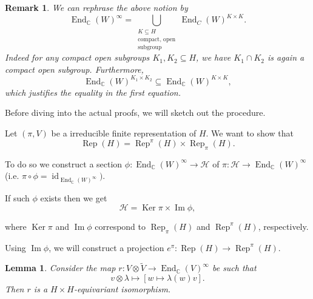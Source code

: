 \documentclass[8pt]{article}
\newtheorem{lemma}{Lemma}[section]
\newtheorem{remark}{Remark}[section]
\DeclareMathOperator{\Rep}{Rep}
\DeclareMathOperator{\End}{End}
\DeclareMathOperator{\Image}{Im}
\DeclareMathOperator{\Ker}{Ker}
\DeclareMathOperator{\id}{id}
\newcommand{\C}[0]{\mathbb{C}}
\newcommand{\hecke}[0]{\mathscr{H}}
\begin{document}
\begin{remark}
  We can rephrase the above notion by
  \begin{equation*}
    \End_\C(W)^\infty = \bigcup_{\substack{K\subseteq H \\ \text{compact, open}\\\text{subgroup}}} \End_C(W)^{K\times K}.
  \end{equation*}
  Indeed for any compact open subgroups $K_1,K_2\subseteq H$, we have $K_1\cap K_2$ is again a compact open subgroup. Furthermore,
  \begin{equation*}
    \End_\C(W)^{K_1\times K_2}\subseteq \End_\C(W)^{K\times K},
  \end{equation*}
  which justifies the equality in the first equation.
\end{remark}

Before diving into the actual proofs, we will sketch out the procedure.\\
\par Let $(\pi,V)$ be a irreducible finite representation of $H$. We want to show that 
\begin{equation*}
  \Rep(H) = \Rep^\pi(H)\times\Rep_\pi(H).
\end{equation*}

To do so we construct a section $\phi:\End_\C(W)^\infty\to\hecke$ of $\pi:\hecke\to\End_\C(W)^\infty$ (i.e. $\pi\circ\phi = \id_{\End_\C(W)^\infty})$.
\par If such $\phi$ exists then we get 
\begin{equation*}
  \hecke = \Ker\pi\times\Image \phi,
\end{equation*}

where $\Ker\pi$ and $\Image\phi$ correspond to $\Rep_\pi(H)$ and $\Rep^\pi(H)$, respectively.

Using $\Image\phi$, we will construct a projection $e^\pi:\Rep(H)\to\Rep^\pi(H)$.

\begin{lemma}
  Consider the map $r:V\otimes\widetilde{V}\to\End_\C(V)^\infty$ be such that 
  \begin{equation*}
    v\otimes \lambda\mapsto [w\mapsto \lambda(w)v].
  \end{equation*}
  Then $r$ is a $H\times H$-equivariant isomorphism.
\end{lemma}
\end{document}
